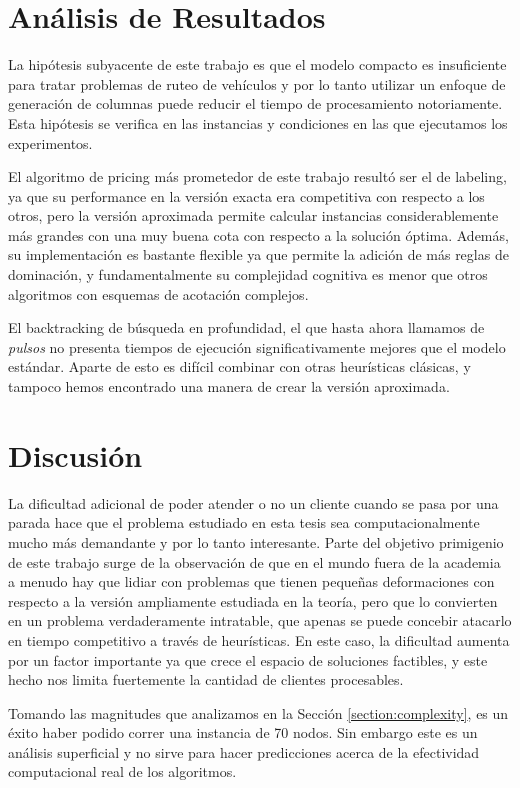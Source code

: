 \section{Análisis de Resultados}

La hipótesis subyacente de este trabajo es que el modelo compacto es insuficiente para tratar problemas de ruteo de vehículos y por lo tanto utilizar un enfoque de generación de columnas puede reducir el tiempo de procesamiento notoriamente. Esta hipótesis se verifica en las instancias y condiciones en las que ejecutamos los experimentos.

El algoritmo de pricing más prometedor de este trabajo resultó ser el de labeling, ya que su performance en la versión exacta era competitiva con respecto a los otros, pero la versión aproximada permite calcular instancias considerablemente más grandes con una muy buena cota con respecto a la solución óptima. Además,  su implementación es bastante flexible ya que permite la adición de más reglas de dominación, y fundamentalmente su complejidad cognitiva es menor que otros algoritmos con esquemas de acotación complejos.

El backtracking de búsqueda en profundidad, el que hasta ahora llamamos de \emph{pulsos} no presenta tiempos de ejecución significativamente mejores que el modelo estándar. Aparte de esto es difícil combinar con otras heurísticas clásicas, y tampoco hemos encontrado una manera de crear la versión aproximada.


\section{Discusión}

La dificultad adicional de poder atender o no un cliente cuando se pasa por una parada hace que el problema estudiado en esta tesis sea computacionalmente mucho más demandante y por lo tanto interesante. Parte del objetivo primigenio de este trabajo surge de la observación de que en el mundo fuera de la academia a menudo hay que lidiar con problemas que tienen pequeñas deformaciones con respecto a la versión ampliamente estudiada en la teoría, pero que lo convierten en un problema verdaderamente intratable, que apenas se puede concebir atacarlo en tiempo competitivo a través de heurísticas. En este caso, la dificultad aumenta por un factor importante ya que crece el espacio de soluciones factibles, y este hecho nos limita fuertemente la cantidad de clientes procesables.

Tomando las magnitudes que analizamos en la Sección \ref{section:complexity}, es un éxito haber podido correr una instancia de 70 nodos. Sin embargo este es un análisis superficial y no sirve para hacer predicciones acerca de la efectividad computacional real de los algoritmos. 

